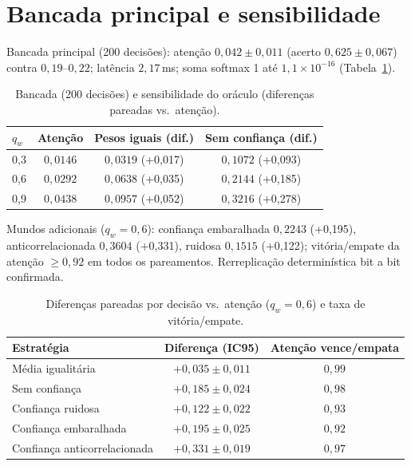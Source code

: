 \section{Bancada principal e sensibilidade}
Bancada principal (200 decisões): atenção $0{,}042\pm0{,}011$ (acerto $0{,}625\pm0{,}067$) contra $0{,}19$--$0{,}22$; latência $2{,}17$\,ms; soma softmax 1 até $1{,}1\times10^{-16}$ (Tabela~\ref{tab:bench}).
\begin{table}[h]
\centering
\caption{Bancada (200 decisões) e sensibilidade do oráculo (diferenças pareadas vs.\ atenção).}
\label{tab:bench}
\begin{tabular}{lccc}
\toprule
$q_w$ & Atenção & Pesos iguais (dif.) & Sem confiança (dif.) \\
\midrule
0,3 & $0{,}0146$ & $0{,}0319$ (+0,017) & $0{,}1072$ (+0,093) \\
0,6 & $0{,}0292$ & $0{,}0638$ (+0,035) & $0{,}2144$ (+0,185) \\
0,9 & $0{,}0438$ & $0{,}0957$ (+0,052) & $0{,}3216$ (+0,278) \\
\bottomrule
\end{tabular}
\end{table}
Mundos adicionais ($q_w=0{,}6$): confiança embaralhada $0{,}2243$ (+0,195), anticorrelacionada $0{,}3604$ (+0,331), ruidosa $0{,}1515$ (+0,122); vitória/empate da atenção $\geq 0{,}92$ em todos os pareamentos. Rerreplicação determinística bit a bit confirmada.
\begin{table}[h]
\centering
\caption{Diferenças pareadas por decisão vs.\ atenção ($q_w=0{,}6$) e taxa de vitória/empate.}
\label{tab:pareado}
\begin{tabular}{lcc}
\toprule
Estratégia & Diferença (IC95) & Atenção vence/empata \\
\midrule
Média igualitária & $+0{,}035\pm0{,}011$ & $0{,}99$ \\
Sem confiança & $+0{,}185\pm0{,}024$ & $0{,}98$ \\
Confiança ruidosa & $+0{,}122\pm0{,}022$ & $0{,}93$ \\
Confiança embaralhada & $+0{,}195\pm0{,}025$ & $0{,}92$ \\
Confiança anticorrelacionada & $+0{,}331\pm0{,}019$ & $0{,}97$ \\
\bottomrule
\end{tabular}
\end{table}
